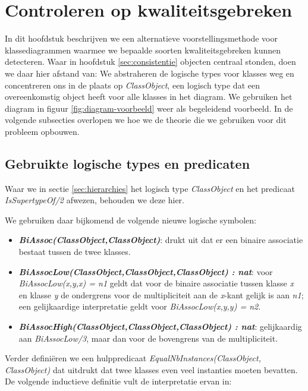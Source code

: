 \chapter{Controleren op kwaliteitsgebreken}\label{sec:kwaliteitsgebrek}
In dit hoofdstuk beschrijven we een alternatieve voorstellingsmethode voor klassediagrammen waarmee we bepaalde soorten kwaliteitsgebreken kunnen detecteren. Waar in hoofdstuk \ref{sec:consistentie} objecten centraal stonden, doen we daar hier afstand van: We abstraheren de logische types voor klasses weg en concentreren ons in de plaats op \textit{ClassObject}, een logisch type dat een overeenkomstig object heeft voor alle klasses in het diagram. We gebruiken het diagram in figuur \ref{fig:diagram-voorbeeld} weer als begeleidend voorbeeld. In de volgende subsecties overlopen we hoe we de theorie die we gebruiken voor dit probleem opbouwen.

\section{Gebruikte logische types en predicaten}
\sloppy Waar we in sectie \ref{sec:hierarchies} het logisch type \textit{ClassObject} en het predicaat \textit{IsSupertypeOf/2} afwezen, behouden we deze hier.

We gebruiken daar bijkomend de volgende nieuwe logische symbolen:

\begin{itemize}
	\item \textbf{\textit{BiAssoc(ClassObject,ClassObject)}}: drukt uit dat er een binaire associatie bestaat tussen de twee klasses.
	\item \sloppy \textbf{\textit{BiAssocLow(ClassObject,ClassObject,ClassObject) : nat}}: voor \\ \textit{BiAssocLow(x,y,x) = n1} geldt dat voor de binaire associatie tussen klasse \textit{x} en klasse \textit{y} de ondergrens voor de multipliciteit aan de \textit{x}-kant gelijk is aan \textit{n1}; een gelijkaardige interpretatie geldt voor \textit{BiAssocLow(x,y,y) = n2}.
	\item \textbf{\textit{BiAssocHigh(ClassObject,ClassObject,ClassObject) : nat}}: gelijkaardig aan \textit{BiAssocLow/3}, maar dan voor de bovengrens van de multipliciteit.
\end{itemize}

Verder defini\"eren we een hulppredicaat \textit{EqualNbInstances(ClassObject, ClassObject)} dat uitdrukt dat twee klasses even veel instanties moeten bevatten. De volgende inductieve definitie vult de interpretatie ervan in:


